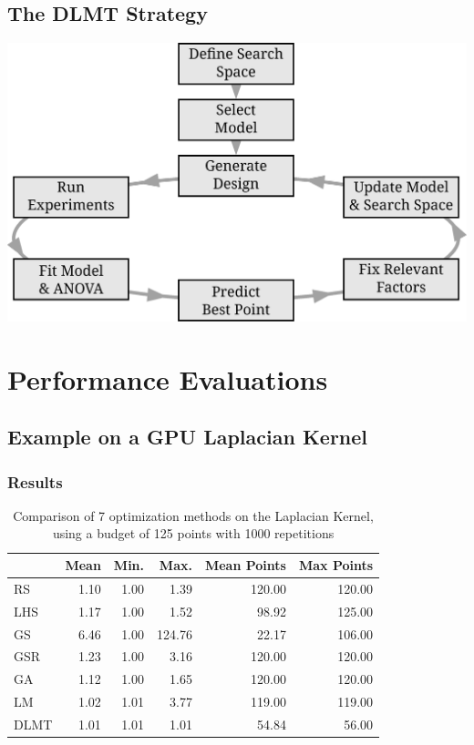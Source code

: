 \documentclass[conference]{IEEEtran}
\begin{document}
\subsection{The DLMT Strategy}
\label{sec:orgee6747d}
\begin{center}
\begin{center}
\includegraphics[width=.8\columnwidth]{./img/doe_anova_strategy.eps}
\end{center}
\end{center}

\section{Performance Evaluations}
\label{sec:orge5bbfdc}
\subsection{Example on a GPU Laplacian Kernel}
\label{sec:org70a0b23}
\subsubsection{Results}
\label{sec:org4256309}
\begin{table}[ht]
\centering
\caption{Comparison of 7 optimization methods on the Laplacian Kernel, using a budget of 125 points with 1000 repetitions}
\begingroup\small
\begin{tabular}{lrrrrr}
  \toprule
 & Mean & Min. & Max. & Mean Points & Max Points \\
  \midrule
RS & 1.10 & 1.00 & 1.39 & 120.00 & 120.00 \\
  LHS & 1.17 & 1.00 & 1.52 & 98.92 & 125.00 \\
  GS & 6.46 & 1.00 & 124.76 & 22.17 & 106.00 \\
  GSR & 1.23 & 1.00 & 3.16 & 120.00 & 120.00 \\
  GA & 1.12 & 1.00 & 1.65 & 120.00 & 120.00 \\
  LM & 1.02 & 1.01 & 3.77 & 119.00 & 119.00 \\
  DLMT & 1.01 & 1.01 & 1.01 & 54.84 & 56.00 \\
   \bottomrule
\end{tabular}
\endgroup
\end{table}
\end{document}
